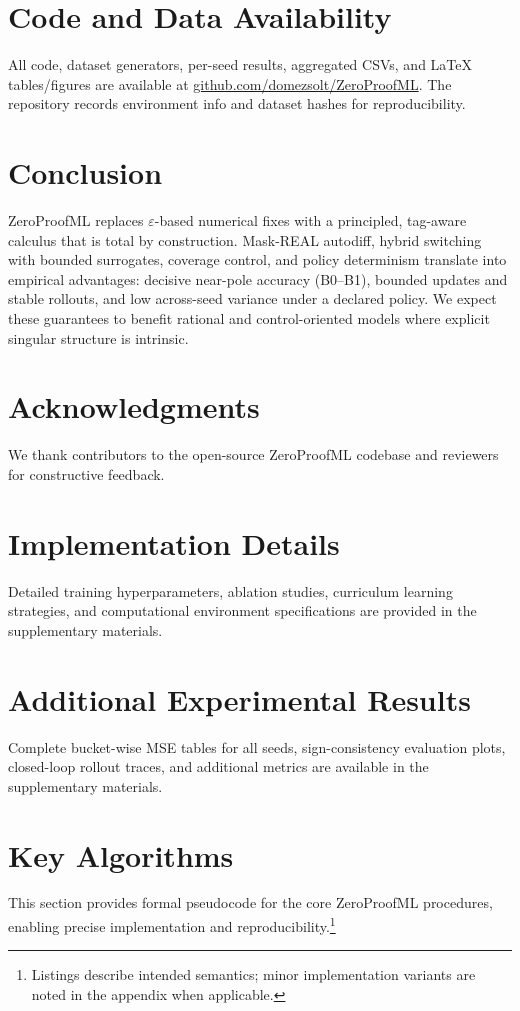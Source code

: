 \documentclass[twoside,11pt]{article}
\begin{document}
\section*{Code and Data Availability}
All code, dataset generators, per-seed results, aggregated CSVs, and LaTeX tables/figures are available at \href{https://github.com/domezsolt/ZeroProofML}{github.com/domezsolt/ZeroProofML}. The repository records environment info and dataset hashes for reproducibility.

\section*{Conclusion}
ZeroProofML replaces $\varepsilon$-based numerical fixes with a principled, tag-aware calculus that is total by construction. Mask-REAL autodiff, hybrid switching with bounded surrogates, coverage control, and policy determinism translate into empirical advantages: decisive near-pole accuracy (B0--B1), bounded updates and stable rollouts, and low across-seed variance under a declared policy. We expect these guarantees to benefit rational and control-oriented models where explicit singular structure is intrinsic.

\section*{Acknowledgments}
We thank contributors to the open-source ZeroProofML codebase and reviewers for constructive feedback.

\endgroup

\section{Implementation Details}
\label{app:implementation}
Detailed training hyperparameters, ablation studies, curriculum learning strategies, and computational environment specifications are provided in the supplementary materials.

\section{Additional Experimental Results}
\label{app:results}
Complete bucket-wise MSE tables for all seeds, sign-consistency evaluation plots, closed-loop rollout traces, and additional metrics are available in the supplementary materials.

\section{Key Algorithms}
\label{app:algorithms}
This section provides formal pseudocode for the core ZeroProofML procedures, enabling precise implementation and reproducibility.\footnote{Listings describe intended semantics; minor implementation variants are noted in the appendix when applicable.}
\end{document}

